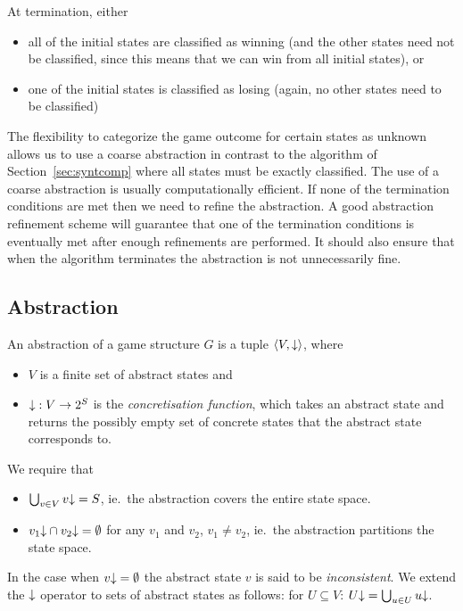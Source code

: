 At termination, either 
\begin{itemize}
\item all of the initial states are classified as winning (and the other states need not be classified, since this means that we can win from all initial states), or
\item one of the initial states is classified as losing (again, no other states need to be classified)
\end{itemize}

The flexibility to categorize the game outcome for certain states as unknown allows us to use a coarse abstraction in contrast to the algorithm of Section~\ref{sec:syntcomp} where all states must be exactly classified. The use of a coarse abstraction is usually computationally efficient. If none of the termination conditions are met then we need to refine the abstraction. A good abstraction refinement scheme will guarantee that one of the termination conditions is eventually met after enough refinements are performed. It should also ensure that when the algorithm terminates the abstraction is not unnecessarily fine.

\subsection{Abstraction}
\label{sec:abstraction_def}

An abstraction of a game structure $G$ is a tuple $\langle V, \mathord{\downarrow}\rangle$, where 
\begin{itemize}
    \item $V$ is a finite set of abstract states and 
    \item $\mathord{\downarrow} : V \rightarrow 2^S $ is the \emph{concretisation function}, which takes an abstract state and returns the possibly empty set of concrete states that the abstract state corresponds to.  
\end{itemize}
        
We require that 
\begin{itemize}
    \item $\bigcup_{v\in V}v\mathord{\downarrow} = S$, ie.\ the abstraction covers the entire state space. 
    \item $v_1\mathord{\downarrow}\cap v_2\mathord{\downarrow} = \emptyset$ for any $v_1$ and $v_2$, $v_1 \neq v_2$, ie.\ the abstraction partitions the state space.
\end{itemize}

In the case when $v\mathord{\downarrow} = \emptyset$ the abstract state $v$ is said to be \emph{inconsistent}. We extend the $\mathord{\downarrow}$ operator to sets of abstract states as follows: for $U\subseteq V$: $U\mathord{\downarrow} = \bigcup_{u\in U}u\mathord{\downarrow}$.

